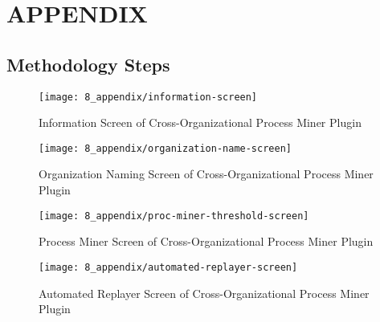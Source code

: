 \chapter{APPENDIX}

\section{Methodology Steps}
\label{sec:appendix-methodology-steps}

\begin{figure}
	\centering
	\texttt{[image: 8\_appendix/information-screen]}
	\caption{Information Screen of Cross-Organizational Process Miner Plugin}
	\label{fig:information-screen}
\end{figure}

\begin{figure}
	\centering
	\texttt{[image: 8\_appendix/organization-name-screen]}
	\caption{Organization Naming Screen of Cross-Organizational Process Miner Plugin}
  \label{fig:organization-name-screen}
\end{figure}

\begin{figure}
	\centering
	\texttt{[image: 8\_appendix/proc-miner-threshold-screen]}
	\caption{Process Miner Screen of Cross-Organizational Process Miner Plugin}
  \label{fig:proc-miner-threshold-screen}
\end{figure}

\begin{figure}
	\centering
	\texttt{[image: 8\_appendix/automated-replayer-screen]}
	\caption{Automated Replayer Screen of Cross-Organizational Process Miner Plugin}
  \label{fig:automated-replayer-screen}
\end{figure}

